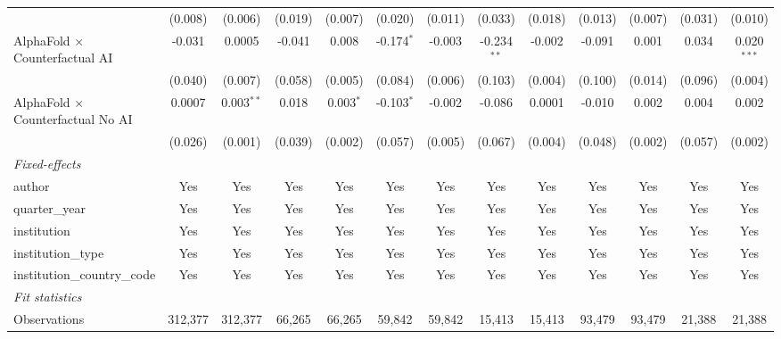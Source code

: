 \begin{tabular}{lcccccccccccc}
                                            & (0.008)      & (0.006)       & (0.019) & (0.007)      & (0.020)      & (0.011) & (0.033)       & (0.018) & (0.013)       & (0.007) & (0.031) & (0.010)\\   
   AlphaFold $\times$ Counterfactual AI     & -0.031       & 0.0005        & -0.041  & 0.008        & -0.174$^{*}$ & -0.003  & -0.234$^{**}$ & -0.002  & -0.091        & 0.001   & 0.034   & 0.020$^{***}$\\   
                                            & (0.040)      & (0.007)       & (0.058) & (0.005)      & (0.084)      & (0.006) & (0.103)       & (0.004) & (0.100)       & (0.014) & (0.096) & (0.004)\\   
   AlphaFold $\times$ Counterfactual No AI  & 0.0007       & 0.003$^{**}$  & 0.018   & 0.003$^{*}$  & -0.103$^{*}$ & -0.002  & -0.086        & 0.0001  & -0.010        & 0.002   & 0.004   & 0.002\\   
                                            & (0.026)      & (0.001)       & (0.039) & (0.002)      & (0.057)      & (0.005) & (0.067)       & (0.004) & (0.048)       & (0.002) & (0.057) & (0.002)\\   
   \midrule
   \emph{Fixed-effects}\\
   author                                   & Yes          & Yes           & Yes     & Yes          & Yes          & Yes     & Yes           & Yes     & Yes           & Yes     & Yes     & Yes\\  
   quarter\_year                            & Yes          & Yes           & Yes     & Yes          & Yes          & Yes     & Yes           & Yes     & Yes           & Yes     & Yes     & Yes\\  
   institution                              & Yes          & Yes           & Yes     & Yes          & Yes          & Yes     & Yes           & Yes     & Yes           & Yes     & Yes     & Yes\\  
   institution\_type                        & Yes          & Yes           & Yes     & Yes          & Yes          & Yes     & Yes           & Yes     & Yes           & Yes     & Yes     & Yes\\  
   institution\_country\_code               & Yes          & Yes           & Yes     & Yes          & Yes          & Yes     & Yes           & Yes     & Yes           & Yes     & Yes     & Yes\\  
   \midrule
   \emph{Fit statistics}\\
   Observations                             & 312,377      & 312,377       & 66,265  & 66,265       & 59,842       & 59,842  & 15,413        & 15,413  & 93,479        & 93,479  & 21,388  & 21,388\\  

\end{tabular}
